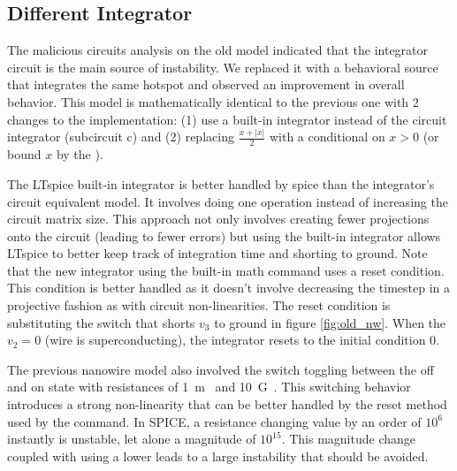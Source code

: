 \subsection{Different Integrator}

The malicious circuits analysis on the old model indicated
that the integrator circuit is the main source of instability. 
We replaced it with a behavioral source that integrates the same hotspot
and observed an improvement in overall behavior.
This model is mathematically identical to the previous one with 2 changes
to the implementation: (1) use a built-in integrator instead of the circuit
integrator (subcircuit c) and (2) replacing $\frac{x+|x|}{2}$ with a conditional
on $x>0$ (or bound $x$ by the ).

The LTspice built-in integrator is better handled
by spice than the integrator's circuit equivalent model.
It involves doing one operation instead of increasing the circuit
matrix size. 
This approach not only involves creating fewer projections onto the circuit 
(leading to fewer errors)
but using the built-in integrator allows LTspice to better keep track of integration
time and shorting to ground. Note that the new integrator using the built-in
 math command uses a reset condition. This condition is better handled as it
doesn't involve decreasing the timestep in a projective fashion as with circuit
non-linearities. The reset condition is substituting the switch that shorts $v_3$
to ground in figure \ref{fig:old_nw}. When the $v_2=0$ (wire is superconducting),
the integrator resets to the initial condition $0$.

The previous nanowire model also involved the switch toggling between the off and on
state with resistances of \qty{1}{m\Omega} and \qty{10}{G\Omega}. This switching behavior
introduces a strong non-linearity that can be better handled by the reset method
used by the  command. In SPICE, a resistance changing value by an order of
$10^6$ instantly is unstable, let alone a magnitude of $10^{15}$. This magnitude
change coupled with using a lower  leads to a large instability that
should be avoided.

